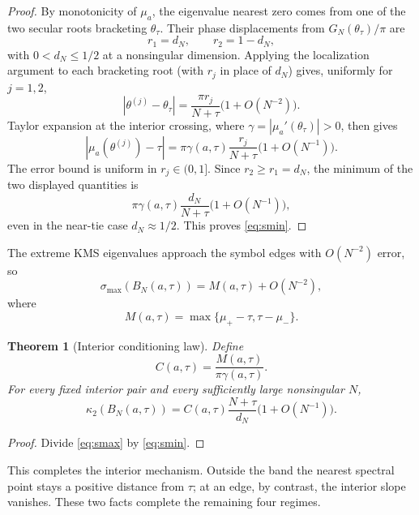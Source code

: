 \documentclass[11pt,reqno]{amsart}
\theoremstyle{plain}
\newtheorem{theorem}{Theorem}
\theoremstyle{definition}
\newcommand{\BN}{B_N}
\begin{document}
\begin{proof}
By monotonicity of $\mu_a$, the eigenvalue nearest zero comes from one of the two
secular roots bracketing $\theta_\tau$.  Their phase displacements from
$G_N(\theta_\tau)/\pi$ are
\[
r_1=d_N,\qquad r_2=1-d_N,
\]
with $0<d_N\le1/2$ at a nonsingular dimension.  Applying the localization argument
to each bracketing root (with $r_j$ in place of $d_N$) gives, uniformly for
$j=1,2$,
\[
|\theta^{(j)}-\theta_\tau|
=\frac{\pi r_j}{N+\tau}\bigl(1+O(N^{-2})\bigr).
\]
Taylor expansion at the interior crossing, where $\gamma=|\mu_a'(\theta_\tau)|>0$,
then gives
\[
|\mu_a(\theta^{(j)})-\tau|
=\pi\gamma(a,\tau)\frac{r_j}{N+\tau}
\bigl(1+O(N^{-1})\bigr).
\]
The error bound is uniform in $r_j\in(0,1]$.  Since $r_2\ge r_1=d_N$, the minimum
of the two displayed quantities is
\[
\pi\gamma(a,\tau)\frac{d_N}{N+\tau}
\bigl(1+O(N^{-1})\bigr),
\]
even in the near-tie case $d_N\approx1/2$.  This proves \eqref{eq:smin}.
\end{proof}

The extreme KMS eigenvalues approach the symbol edges with $O(N^{-2})$ error, so
\begin{equation}\label{eq:smax}
\sigma_{\max}(\BN(a,\tau))
=M(a,\tau)+O(N^{-2}),
\end{equation}
where
\begin{equation}\label{eq:M}
M(a,\tau)=\max\{\mu_+-\tau,\tau-\mu_-\}.
\end{equation}

\begin{theorem}[Interior conditioning law]\label{thm:kappa}
Define
\begin{equation}\label{eq:C}
C(a,\tau)=\frac{M(a,\tau)}{\pi\gamma(a,\tau)}.
\end{equation}
For every fixed interior pair and every sufficiently large nonsingular $N$,
\begin{equation}\label{eq:kappa}
\boxed{
\kappa_2(\BN(a,\tau))
=C(a,\tau)\frac{N+\tau}{d_N}
\bigl(1+O(N^{-1})\bigr).}
\end{equation}
\end{theorem}

\begin{proof}
Divide \eqref{eq:smax} by \eqref{eq:smin}.
\end{proof}

This completes the interior mechanism.  Outside the band the nearest spectral point
stays a positive distance from $\tau$; at an edge, by contrast, the interior slope
vanishes.  These two facts complete the remaining four regimes.
\end{document}
